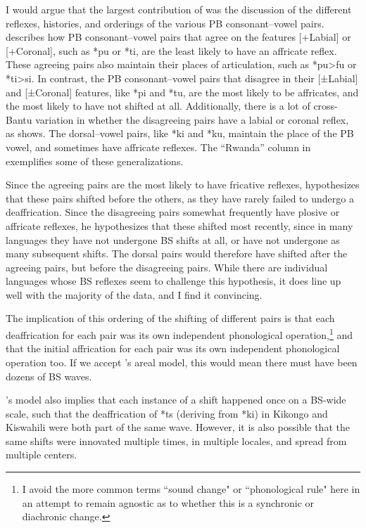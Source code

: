 \documentclass[output=paper,colorlinks,citecolor=brown
]{langscibook}
\begin{document}
I would argue that the largest contribution of \citet{Janson2007} was the discussion of the different reflexes, histories, and orderings of the various PB consonant--vowel pairs. \citeauthor{Janson2007} describes how PB consonant--vowel pairs that agree on the features [+Labial] or [+Coronal], such as *pu or *ti, are the least likely to have an affricate reflex. These agreeing pairs also maintain their places of articulation, such as *pu>fu or *ti>si. In contrast, the PB consonant--vowel pairs that disagree in their [±Labial] and [±Coronal] features, like *pi and *tu, are the most likely to be affricates, and the most likely to have not shifted at all. Additionally, there is a lot of cross-Bantu variation in whether the disagreeing pairs have a labial or coronal reflex, as  shows. The dorsal--vowel pairs, like *ki and *ku, maintain the place of the PB vowel, and sometimes have affricate reflexes. The “Rwanda” column in  exemplifies some of these generalizations.

Since the agreeing pairs are the most likely to have fricative reflexes, \citeauthor{Janson2007} hypothesizes that these pairs shifted before the others, as they have rarely failed to undergo a deaffrication. Since the disagreeing pairs somewhat frequently have plosive or affricate reflexes, he hypothesizes that these shifted most recently, since in many languages they have not undergone BS shifts at all, or have not undergone as many subsequent shifts. The dorsal pairs would therefore have shifted after the agreeing pairs, but before the disagreeing pairs. While there are individual languages whose BS reflexes seem to challenge this hypothesis, it does line up well with the majority of the data, and I find it convincing.

The implication of this ordering of the shifting of different pairs is that each deaffrication for each pair was its own independent phonological operation,\footnote{I avoid the more common terms “sound change" or “phonological rule" here in an attempt to remain agnostic as to whether this is a synchronic or diachronic change.} and that the initial affrication for each pair was its own independent phonological operation too. If we accept \citeauthor{Janson2007}’s areal model, this would mean there must have been dozens of BS waves.

\citeauthor{Janson2007}’s model also implies that each instance of a shift happened once on a BS-wide scale, such that the deaffrication of *ts (deriving from *ki) in Kikongo and Kiswahili were both part of the same wave. However, it is also possible that the same shifts were innovated multiple times, in multiple locales, and spread from multiple centers. 
\end{document}
